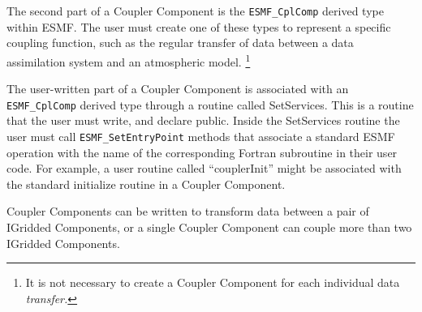 The second part of a Coupler Component is the {\tt ESMF\_CplComp}
derived type within ESMF.  The user must create one of these types
to represent a specific coupling function, such as the regular
transfer of data between a data assimilation system and an 
atmospheric model.  \footnote{It is not necessary to create 
a Coupler Component for each individual data {\it transfer.}}

The user-written part of a Coupler Component is associated with an
{\tt ESMF\_CplComp} derived type through a routine called SetServices.
This is a routine that the user must write, and declare public.
Inside the SetServices routine the user must call 
{\tt ESMF\_SetEntryPoint} methods that associate a standard ESMF 
operation with the name of the corresponding Fortran subroutine in 
their user code.  For example, a user routine called ``couplerInit''
might be associated with the standard initialize routine in a 
Coupler Component.

Coupler Components can be written to transform data between a 
pair of IGridded Components, or a single Coupler Component can couple 
more than two IGridded Components.

